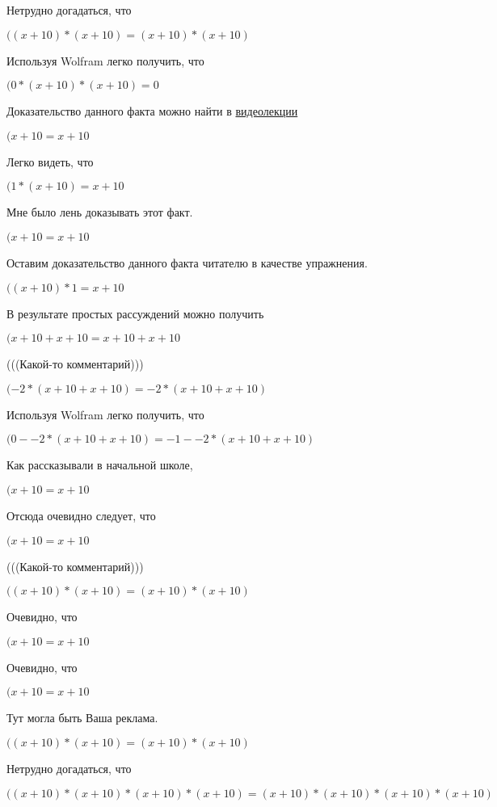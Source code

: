\documentclass[12pt,a4paper,fleqn]{article}
\theoremstyle{definition}
\begin{document}
Нетрудно догадаться, что

$(( x  +  10 ) * ( x  +  10 ) = ( x  +  10 ) * ( x  +  10 )$

Используя Wolfram легко получить, что

$( 0  * ( x  +  10 ) * ( x  +  10 ) =  0 $

Доказательство данного факта можно найти в \href{https://www.youtube.com/watch?v=dQw4w9WgXcQ}{видеолекции}

$( x  +  10  =  x  +  10 $

Легко видеть, что

$( 1  * ( x  +  10 ) =  x  +  10 $

Мне было лень доказывать этот факт.

$( x  +  10  =  x  +  10 $

Оставим доказательство данного факта читателю в качестве упражнения.

$(( x  +  10 ) *  1  =  x  +  10 $

В результате простых рассуждений можно получить

$( x  +  10  +  x  +  10  =  x  +  10  +  x  +  10 $

(((Какой-то комментарий)))

$( -2  * ( x  +  10  +  x  +  10 ) =  -2  * ( x  +  10  +  x  +  10 )$

Используя Wolfram легко получить, что

$( 0  -  -2  * ( x  +  10  +  x  +  10 ) =  -1  -  -2  * ( x  +  10  +  x  +  10 )$

Как рассказывали в начальной школе,

$( x  +  10  =  x  +  10 $

Отсюда очевидно следует, что

$( x  +  10  =  x  +  10 $

(((Какой-то комментарий)))

$(( x  +  10 ) * ( x  +  10 ) = ( x  +  10 ) * ( x  +  10 )$

Очевидно, что

$( x  +  10  =  x  +  10 $

Очевидно, что

$( x  +  10  =  x  +  10 $

Тут могла быть Ваша реклама.

$(( x  +  10 ) * ( x  +  10 ) = ( x  +  10 ) * ( x  +  10 )$

Нетрудно догадаться, что

$(( x  +  10 ) * ( x  +  10 ) * ( x  +  10 ) * ( x  +  10 ) = ( x  +  10 ) * ( x  +  10 ) * ( x  +  10 ) * ( x  +  10 )$
\end{document}
